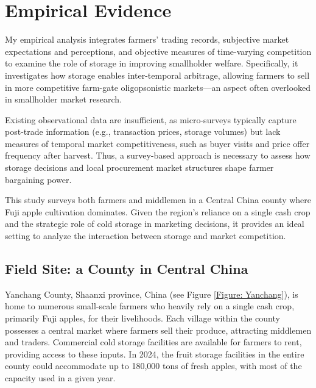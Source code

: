\documentclass[12pt]{article}
\begin{document}
\section{Empirical Evidence}

\noindent My empirical analysis integrates farmers' trading records, subjective market expectations and perceptions, and objective measures of time-varying competition to examine the role of storage in improving smallholder welfare. Specifically, it investigates how storage enables inter-temporal arbitrage, allowing farmers to sell in more competitive farm-gate oligopsonistic markets—an aspect often overlooked in smallholder market research.

Existing observational data are insufficient, as micro-surveys typically capture post-trade information (e.g., transaction prices, storage volumes) but lack measures of temporal market competitiveness, such as buyer visits and price offer frequency after harvest. Thus, a survey-based approach is necessary to assess how storage decisions and local procurement market structures shape farmer bargaining power.

This study surveys both farmers and middlemen in a Central China county where Fuji apple cultivation dominates. Given the region's reliance on a single cash crop and the strategic role of cold storage in marketing decisions, it provides an ideal setting to analyze the interaction between storage and market competition.


\subsection{Field Site: a County in Central China}
\noindent Yanchang County, Shaanxi province, China (see Figure \ref{Figure: Yanchang}), is home to numerous small-scale farmers who heavily rely on a single cash crop, primarily Fuji apples, for their livelihoods. Each village within the county possesses a central market where farmers sell their produce, attracting middlemen and traders. Commercial cold storage facilities are available for farmers to rent, providing access to these inputs. In 2024, the fruit storage facilities in the entire county could accommodate up to 180,000 tons of fresh apples, with most of the capacity used in a given year.
\end{document}
